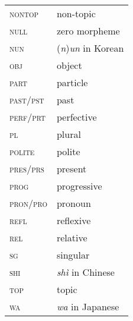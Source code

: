 \begin{multicols}{2}
\begin{tabular}{lp{4.5cm}}
\textsc{nontop} & non-topic \\ 
\textsc{null}  & zero morpheme \\ 
\textsc{nun} & (\textit{n})\textit{un} in Korean \\ 
\textsc{obj} & object \\ 
\textsc{part} & particle \\ 
\textsc{past}/\textsc{pst} & past \\ 
\textsc{perf}/\textsc{prt} & perfective \\ 
\textsc{pl} & plural \\ 
\textsc{polite} & polite \\ 
\textsc{pres}/\textsc{prs} & present \\ 
\textsc{prog} & progressive \\ 
\textsc{pron}/\textsc{pro} & pronoun \\ 
\textsc{refl} & reflexive \\ 
\textsc{rel} & relative \\ 
\textsc{sg} & singular \\ 
\textsc{shi} & \textit{sh\`{i}} in Chinese \\ 
\textsc{top} & topic \\ 
\textsc{wa} & \textit{wa} in Japanese \\
\end{tabular}

 
\end{multicols} 
